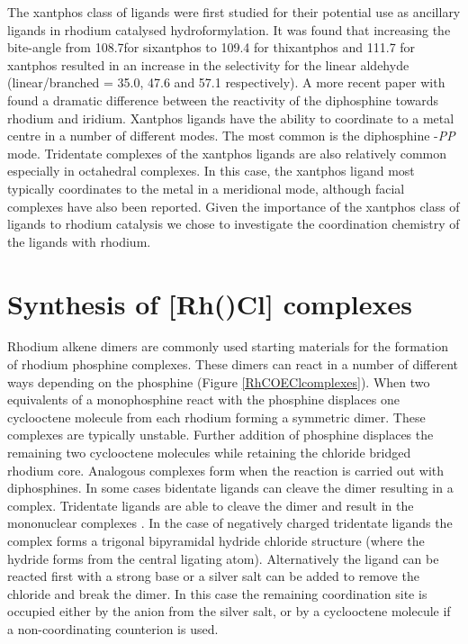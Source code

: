 
The xantphos class of ligands were first studied for their potential use as ancillary ligands in rhodium catalysed hydroformylation\cite{Kranenburg1995}.  It was found that increasing the bite-angle from 108.7\degrees for sixantphos to 109.4 \degrees for thixantphos and 111.7 \degrees for xantphos resulted in an increase in the selectivity for the linear aldehyde (linear/branched = 35.0, 47.6 and 57.1 respectively).  A more recent paper with \iPrxantphos{} found a dramatic difference between the reactivity of the diphosphine towards rhodium and iridium.  Xantphos ligands have the ability to coordinate to a metal centre in a number of different modes.  The most common is the diphosphine -\emph{PP\textprime} mode.  Tridentate \POP{} complexes of the xantphos ligands are also relatively common especially in octahedral complexes.  In this case, the xantphos ligand most typically coordinates to the metal in a meridional mode, although facial complexes have also been reported.\cite{Dallanegra2012, Pawley2012}  Given the importance of the xantphos class of ligands to rhodium catalysis we chose to investigate the coordination chemistry of the \tBuxantphos{} ligands with rhodium.  

\section{Synthesis of [Rh(\tBuxantphosk)Cl] complexes}
\label{section:rhodiumchloride}

Rhodium alkene dimers are commonly used starting materials for the formation of rhodium phosphine complexes.  These dimers can react in a number of different ways depending on the phosphine (Figure \ref{RhCOEClcomplexes}).  When two equivalents of a monophosphine react with  the phosphine displaces one cyclooctene molecule from each rhodium forming a symmetric dimer.\cite{Canepa2003}  These complexes are typically unstable.  Further addition of phosphine displaces the remaining two cyclooctene molecules while retaining the chloride bridged rhodium core.\cite{Bleeke1986}  Analogous complexes form when the reaction is carried out with diphosphines.\cite{Fryzuk1989}  In some cases bidentate ligands can cleave the dimer resulting in a \ce{[Rh(LL)(COE)Cl]} complex.\cite{Hashimoto2010}  Tridentate ligands are able to cleave the dimer and result in the mononuclear complexes \ce{[Rh(LLL)Cl]}\cite{Khan1988, Hermann2002}.  In the case of negatively charged tridentate ligands the complex forms a trigonal bipyramidal hydride chloride structure (where the hydride forms from the central ligating atom).\cite{Boom1998, Winter2003, Salem2008}  Alternatively the ligand can be reacted first with a strong base or a silver salt can be added to remove the chloride and break the dimer.  In this case the remaining coordination site is occupied either by the anion from the silver salt, or by a cyclooctene molecule if a non-coordinating counterion is used.\cite{Fryzuk1986, Hanson2008}

